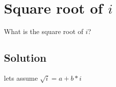 \section {Square root of $i$}

What is the square root of $i$?

\subsection{Solution}

lets assume $\sqrt{i} = a + b*i$
